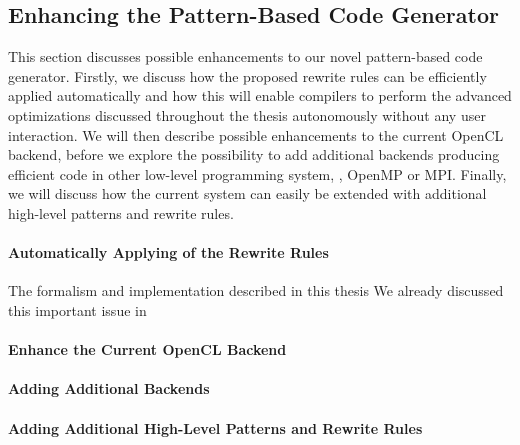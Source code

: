 \subsection{Enhancing the Pattern-Based Code Generator}
\label{section:future-work:codeGenerator}

This section discusses possible enhancements to our novel pattern-based code generator. 
Firstly, we discuss how the proposed rewrite rules can be efficiently applied automatically and how this will enable compilers to perform the advanced optimizations discussed throughout the thesis autonomously without any user interaction.
We will then describe possible enhancements to the current OpenCL backend, before we explore the possibility to add additional backends producing efficient code in other low-level programming system, \eg, OpenMP or MPI.
Finally, we will discuss how the current system can easily be extended with additional high-level patterns and rewrite rules.

\paragraph{Automatically Applying of the Rewrite Rules}
The formalism and implementation described in this thesis 
We already discussed this important issue in 

\paragraph{Enhance the Current OpenCL Backend}

\paragraph{Adding Additional Backends}

\paragraph{Adding Additional High-Level Patterns and Rewrite Rules}

